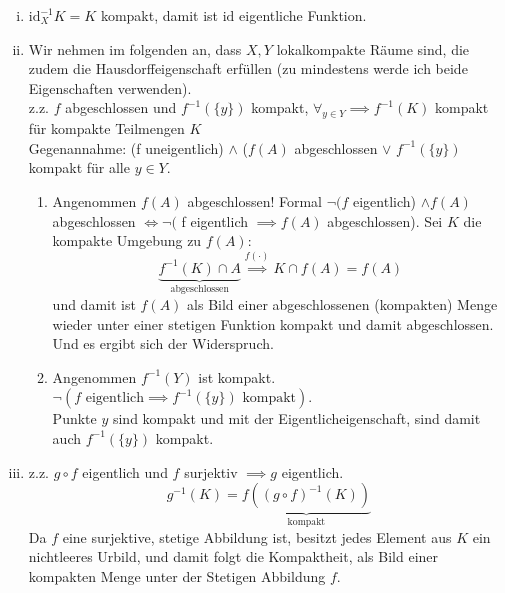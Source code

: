 \documentclass{scrartcl}
\begin{document}
\begin{aufgabe}
\begin{enumerate}[(i)]
\item $\text{id}_X^{-1}{K}=K$ kompakt, damit ist $ \text{id} $ eigentliche Funktion.
\item Wir nehmen im folgenden an, dass $ X,Y $ lokalkompakte Räume sind, die zudem die Hausdorffeigenschaft erfüllen (zu mindestens werde ich beide Eigenschaften verwenden).\\
z.z. $ f $ abgeschlossen und $ f^{-1}(\{y\}) $ kompakt, $ \forall_{y\in Y} \implies f^{-1}(K) $ kompakt für kompakte Teilmengen $ K $\\
Gegenannahme: (f uneigentlich) $ \land $ ($ f(A) $ abgeschlossen $ \lor $ $ f^{-1}(\{y\})  $ kompakt für alle $ y\in Y $.
\begin{enumerate}
\item Angenommen $ f(A) $ abgeschlossen!  Formal $ \lnot  (f $ eigentlich) $ \land f(A)  $ abgeschlossen $ \iff \lnot( $ f eigentlich $ \implies  f(A)$ abgeschlossen).  Sei $ K $ die kompakte Umgebung zu $ f(A) $:
\[
\underbrace{f^{-1}(K)\cap A}_{\text{abgeschlossen}} \stackrel{f(\cdot)}\implies K\cap f(A)=f(A)
\] 
und damit ist $ f(A) $ als Bild einer abgeschlossenen (kompakten) Menge wieder unter einer stetigen Funktion kompakt und damit abgeschlossen. Und es ergibt sich der Widerspruch.
\item Angenommen $ f^{-1}(Y) $ ist kompakt. $ \lnot (f \text{ eigentlich} \implies f^{-1}(\{y\}) \text{ kompakt}) $.\\
Punkte $ y $ sind kompakt und mit der Eigentlicheigenschaft, sind damit auch $ f^{-1}(\{y\}) $ kompakt.   
\end{enumerate} 
\item z.z. $ g\circ f $ eigentlich und $ f $ surjektiv $ \implies g $ eigentlich.\\
\[
g^{-1}(K)=\underbrace{f((g\circ f)^{-1}(K))}_{\text{kompakt}}
\]
Da $ f $ eine surjektive, stetige Abbildung ist, besitzt jedes Element aus $ K $ ein nichtleeres Urbild, und damit folgt die Kompaktheit, als Bild einer kompakten Menge unter der Stetigen Abbildung $ f $. 
\end{enumerate}
\end{aufgabe}
\end{document}
